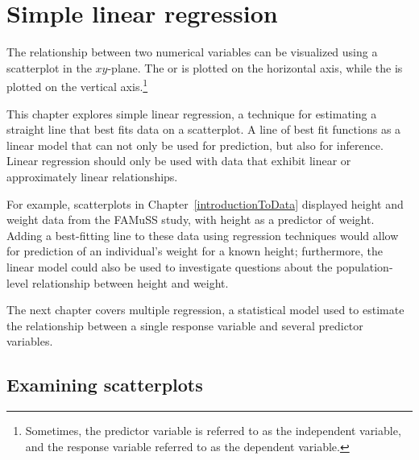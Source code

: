 
\chapter{Simple linear regression}
\label{linRegrForTwoVar}

The relationship between two numerical variables can be visualized using a scatterplot in the $xy$-plane. The  or  is plotted on the horizontal axis, while the  is plotted on the vertical axis.\footnote{Sometimes, the predictor variable is referred to as the independent variable, and the response variable referred to as the dependent variable.} 

This chapter explores simple linear regression, a technique for estimating a straight line that best fits data on a scatterplot. A line of best fit functions as a linear model that can not only be used for prediction, but also for inference. Linear regression should only be used with data that exhibit linear or approximately linear relationships. 


For example, scatterplots in Chapter~\ref{introductionToData} displayed height and weight data from the FAMuSS study, with height as a predictor of weight. Adding a best-fitting line to these data using regression techniques would allow for prediction of an individual's weight for a known height; furthermore, the linear model could also be used to investigate questions about the population-level relationship between height and weight. 

The next chapter covers multiple regression, a statistical model used to estimate the relationship between a single response variable and several predictor variables.

\section{Examining scatterplots}
\label{examiningScatterPlots}

